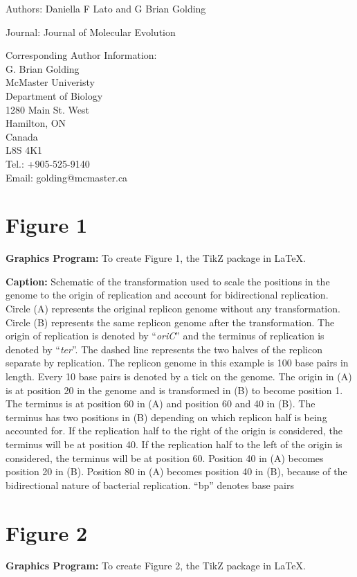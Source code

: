 \documentclass[11pt]{article}
\date{Author Affiliations: \\ \textbf{Daniella F Lato} \\ McMaster University \\ Department of Biology \\ 1280 Main St. West \\
	Hamilton, ON \\
	Canada \\
	L8S 4K1 \\
	Tel.: +905-525-9140\\
	Email: latodf@mcmaster.ca}
\begin{document}
{Authors: \sc Daniella F Lato and G Brian Golding}

{Journal: \sc Journal of Molecular Evolution}

{Corresponding Author Information: \\ G. Brian Golding \\
	McMaster Univeristy \\
	Department of Biology \\
	1280 Main St. West \\
	Hamilton, ON \\
	Canada \\
	L8S 4K1 \\
	Tel.: +905-525-9140\\
	Email: golding@mcmaster.ca}
\bigskip

\section*{Figure 1}
\textbf{Graphics Program:}
To create Figure 1, the TikZ package in \LaTeX.


\textbf{Caption:} Schematic of the transformation used to scale the positions in the genome to the origin of replication and account for bidirectional replication. Circle (A) represents the original replicon genome without any transformation. Circle (B) represents the same replicon genome after the transformation. The origin of replication is denoted by ``\textit{oriC}'' and the terminus of replication is denoted by ``\textit{ter}''. The dashed line represents the two halves of the replicon separate by replication. The replicon genome in this example is 100 base pairs in length. Every 10 base pairs is denoted by a tick on the genome. The origin in (A) is at position 20 in the genome and is transformed in (B) to become position 1. The terminus is at position 60 in (A) and position 60 and 40 in (B). The terminus has two positions in (B) depending on which replicon half is being accounted for.
If the replication half to the right of the origin is considered, the terminus will be at position 40.
If the replication half to the left of the origin is considered, the terminus will be at position 60.
Position 40 in (A) becomes position 20 in (B). Position 80 in (A) becomes position 40 in (B), because of the bidirectional nature of bacterial replication. ``bp'' denotes base pairs

\section*{Figure 2}
\textbf{Graphics Program:}
To create Figure 2, the TikZ package in \LaTeX.
\end{document}
